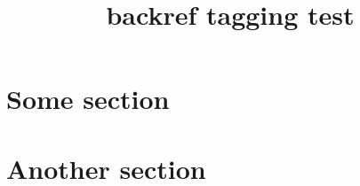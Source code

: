 \documentclass{article}
\title{backref tagging test}
\begin{document}
\section{Some section}
\cite{inbook-full}
\section{Another section}
\cite{booklet-full,manual-full}



\end{document}
